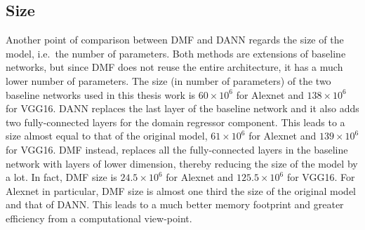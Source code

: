 \documentclass[../main.tex]{subfiles}
\begin{document}
    \subsection{Size}
	Another point of comparison between DMF and DANN regards the size of the model, i.e.\ the number of parameters. Both methods
	are extensions of baseline networks, but since DMF does not reuse the entire architecture, it has a much lower number of parameters.
	The size (in number of parameters) of the two baseline networks used in this thesis work is $60 \times 10^{6}$ for Alexnet and $138 \times 10^{6}$ for
	VGG16. DANN replaces the last layer of the baseline network and it also adds two fully-connected layers for the domain
    regressor component. This leads to a size almost equal to that of the original model, $61 \times 10^{6}$ for Alexnet and $139 \times 10^{6}$ for VGG16.
    DMF instead, replaces all the fully-connected layers in the baseline network with layers of lower dimension, thereby reducing
    the size of the model by a lot. In fact, DMF size is $24.5 \times 10^{6}$ for Alexnet and $125.5 \times 10^{6}$ for VGG16. For Alexnet in particular,
    DMF size is almost one third the size of the original model and that of DANN\@. This leads to a much better memory footprint
    and greater efficiency from a computational view-point.
\end{document}
